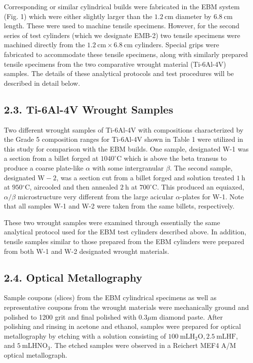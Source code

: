 \documentclass[10pt]{article}
\begin{document}
Corresponding or similar cylindrical builds were fabricated in the EBM system (Fig. 1) which were either slightly larger than the $1.2 \mathrm{~cm}$ diameter by $6.8 \mathrm{~cm}$ length. These were used to machine tensile specimens. However, for the second series of test cylinders (which we designate EMB-2) two tensile specimens were machined directly from the $1.2 \mathrm{~cm} \times 6.8 \mathrm{~cm}$ cylinders. Special grips were fabricated to accommodate these tensile specimens, along with similarly prepared tensile specimens from the two comparative wrought material (Ti-6Al-4V) samples. The details of these analytical protocols and test procedures will be described in detail below.

\subsection*{2.3. Ti-6Al-4V Wrought Samples}
Two different wrought samples of Ti-6Al-4V with compositions characterized by the Grade 5 composition ranges for Ti-6Al-4V shown in Table 1 were utilized in this study for comparison with the EBM builds. One sample, designated W-1 was a section from a billet forged at $1040^{\circ} \mathrm{C}$ which is above the beta transus to produce a coarse plate-like $\alpha$ with some intergranular $\beta$. The second sample, designated $\mathrm{W}-2$, was a section cut from a billet forged and solution treated $1 \mathrm{~h}$ at $950{ }^{\circ} \mathrm{C}$, aircooled and then annealed $2 \mathrm{~h}$ at $700^{\circ} \mathrm{C}$. This produced an equiaxed, $\alpha / \beta$ microstructure very different from the large acicular $\alpha$-plates for W-1. Note that all samples W-1 and W-2 were taken from the same billets, respectively.

These two wrought samples were examined through essentially the same analytical protocol used for the EBM test cylinders described above. In addition, tensile samples similar to those prepared from the EBM cylinders were prepared from both W-1 and W-2 designated wrought materials.

\subsection*{2.4. Optical Metallography}
Sample coupons (slices) from the EBM cylindrical specimens as well as representative coupons from the wrought materials were mechanically ground and polished to 1200 grit and final polished with $0.3 \mu \mathrm{m}$ diamond paste. After polishing and rinsing in acetone and ethanol, samples were prepared for optical metallography by etching with a solution consisting of $100 \mathrm{~mL} \mathrm{H}_{2} \mathrm{O}, 2.5 \mathrm{~mL} \mathrm{HF}$, and $5 \mathrm{~mL} \mathrm{HNO}_{3}$. The etched samples were observed in a Reichert MEF4 A/M optical metallograph.
\end{document}
